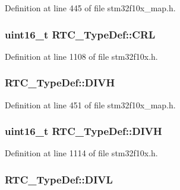 Definition at line 445 of file stm32f10x\+\_\+map.\+h.

\subsubsection[{\texorpdfstring{C\+RL}{CRL}}]{ {\bf uint16\+\_\+t} R\+T\+C\+\_\+\+Type\+Def\+::\+C\+RL}\hypertarget{struct_r_t_c___type_def_a95b9e1ed044a4e1cc3632326e7250767}{}\label{struct_r_t_c___type_def_a95b9e1ed044a4e1cc3632326e7250767}


Definition at line 1108 of file stm32f10x.\+h.

\subsubsection[{\texorpdfstring{D\+I\+VH}{DIVH}}]{ R\+T\+C\+\_\+\+Type\+Def\+::\+D\+I\+VH}\hypertarget{struct_r_t_c___type_def_a2c1a99e56e49cf4c091fad3c9f4a282c}{}\label{struct_r_t_c___type_def_a2c1a99e56e49cf4c091fad3c9f4a282c}


Definition at line 451 of file stm32f10x\+\_\+map.\+h.

\subsubsection[{\texorpdfstring{D\+I\+VH}{DIVH}}]{ {\bf uint16\+\_\+t} R\+T\+C\+\_\+\+Type\+Def\+::\+D\+I\+VH}\hypertarget{struct_r_t_c___type_def_a224b675d0ecad8b6e26d9e4c32691a18}{}\label{struct_r_t_c___type_def_a224b675d0ecad8b6e26d9e4c32691a18}


Definition at line 1114 of file stm32f10x.\+h.

\subsubsection[{\texorpdfstring{D\+I\+VL}{DIVL}}]{ R\+T\+C\+\_\+\+Type\+Def\+::\+D\+I\+VL}\hypertarget{struct_r_t_c___type_def_a58dccd10d31dc13fa1c7dbfbd2b76c73}{}\label{struct_r_t_c___type_def_a58dccd10d31dc13fa1c7dbfbd2b76c73}


